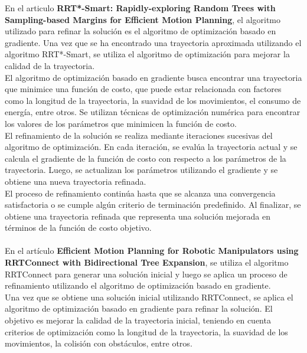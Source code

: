 \documentclass{article}
\begin{document}
\begin{itemize}
  En el articulo \textbf{RRT*-Smart: Rapidly-exploring Random Trees with Sampling-based Margins for Efficient Motion Planning}, el algoritmo utilizado para refinar la solución es el algoritmo de optimización basado en gradiente. Una vez que se ha encontrado una trayectoria aproximada utilizando el algoritmo RRT*-Smart, se utiliza el algoritmo de optimización para mejorar la calidad de la trayectoria.\\

  El algoritmo de optimización basado en gradiente busca encontrar una trayectoria que minimice una función de costo, que puede estar relacionada con factores como la longitud de la trayectoria, la suavidad de los movimientos, el consumo de energía, entre otros. Se utilizan técnicas de optimización numérica para encontrar los valores de los parámetros que minimicen la función de costo.\\

  El refinamiento de la solución se realiza mediante iteraciones sucesivas del algoritmo de optimización. En cada iteración, se evalúa la trayectoria actual y se calcula el gradiente de la función de costo con respecto a los parámetros de la trayectoria. Luego, se actualizan los parámetros utilizando el gradiente y se obtiene una nueva trayectoria refinada.\\

  El proceso de refinamiento continúa hasta que se alcanza una convergencia satisfactoria o se cumple algún criterio de terminación predefinido. Al finalizar, se obtiene una trayectoria refinada que representa una solución mejorada en términos de la función de costo objetivo.\\\\

  En el artículo \textbf{Efficient Motion Planning for Robotic Manipulators using RRTConnect with Bidirectional Tree Expansion}, se utiliza el algoritmo RRTConnect para generar una solución inicial y luego se aplica un proceso de refinamiento utilizando el algoritmo de optimización basado en gradiente.\\

 Una vez que se obtiene una solución inicial utilizando RRTConnect, se aplica el algoritmo de optimización basado en gradiente para refinar la solución. El objetivo es mejorar la calidad de la trayectoria inicial, teniendo en cuenta criterios de optimización como la longitud de la trayectoria, la suavidad de los movimientos, la colisión con obstáculos, entre otros.\\


\end{itemize}
\end{document}
